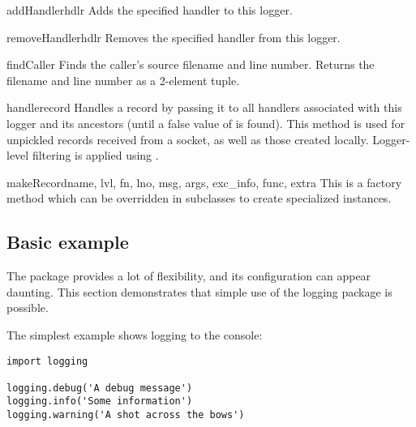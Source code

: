 \begin{methoddesc}{addHandler}{hdlr}
Adds the specified handler  to this logger.
\end{methoddesc}

\begin{methoddesc}{removeHandler}{hdlr}
Removes the specified handler  from this logger.
\end{methoddesc}

\begin{methoddesc}{findCaller}{}
Finds the caller's source filename and line number. Returns the filename
and line number as a 2-element tuple.
\end{methoddesc}

\begin{methoddesc}{handle}{record}
Handles a record by passing it to all handlers associated with this logger
and its ancestors (until a false value of  is found).
This method is used for unpickled records received from a socket, as well
as those created locally. Logger-level filtering is applied using
.
\end{methoddesc}

\begin{methoddesc}{makeRecord}{name, lvl, fn, lno, msg, args, exc_info,
                               func, extra}
This is a factory method which can be overridden in subclasses to create
specialized  instances.
\end{methoddesc}

\subsection{Basic example \label{minimal-example}}


The  package provides a lot of flexibility, and its
configuration can appear daunting.  This section demonstrates that simple
use of the logging package is possible.

The simplest example shows logging to the console:

\begin{verbatim}
import logging

logging.debug('A debug message')
logging.info('Some information')
logging.warning('A shot across the bows')
\end{verbatim}

